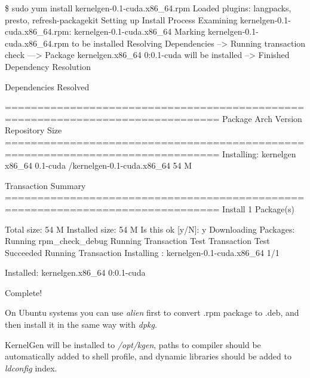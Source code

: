 \documentclass[a4,12pt]{article}
\begin{document}
\begin{code}
\$ sudo yum install kernelgen-0.1-cuda.x86_64.rpm
Loaded plugins: langpacks, presto, refresh-packagekit
Setting up Install Process
Examining kernelgen-0.1-cuda.x86_64.rpm: kernelgen-0.1-cuda.x86_64
Marking kernelgen-0.1-cuda.x86_64.rpm to be installed
Resolving Dependencies
--> Running transaction check
---> Package kernelgen.x86_64 0:0.1-cuda will be installed
--> Finished Dependency Resolution

Dependencies Resolved

===============================================================================
 Package              Arch      Version     Repository                   Size
===============================================================================
Installing:
 kernelgen            x86_64    0.1-cuda    /kernelgen-0.1-cuda.x86_64   54 M

Transaction Summary
===============================================================================
Install       1 Package(s)

Total size: 54 M
Installed size: 54 M
Is this ok [y/N]: y
Downloading Packages:
Running rpm_check_debug
Running Transaction Test
Transaction Test Succeeded
Running Transaction
  Installing : kernelgen-0.1-cuda.x86_64                                                                                                         1/1 

Installed:
  kernelgen.x86_64 0:0.1-cuda                                                                                                                        

Complete!
\end{code}

On Ubuntu systems you can use \emph{alien} first to convert .rpm package to .deb, and then install it in the same way with \emph{dpkg}.

KernelGen will be installed to \emph{/opt/kgen}, paths to compiler should be automatically added to shell profile, and dynamic libraries should be added to \emph{ldconfig} index.
\end{document}

